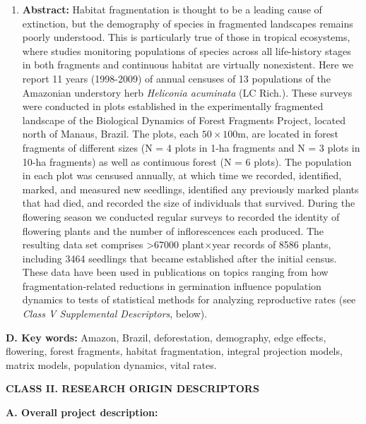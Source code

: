 \documentclass[
  12pt,
  man, donotrepeattitle,floatsintext]{apa6}
\providecommand{\tightlist}{%
  \setlength{\itemsep}{0pt}\setlength{\parskip}{0pt}}
\begin{document}
\begin{enumerate}
\def\labelenumi{\arabic{enumi}.}
\setcounter{enumi}{1}
\tightlist
\item
  \textbf{Abstract:} Habitat fragmentation is thought to be a leading cause of extinction, but the demography of species in fragmented landscapes remains poorly understood. This is particularly true of those in tropical ecosystems, where studies monitoring populations of species across all life-history stages in both fragments and continuous habitat are virtually nonexistent. Here we report 11 years (1998-2009) of annual censuses of 13 populations of the Amazonian understory herb \emph{Heliconia acuminata} (LC Rich.). These surveys were conducted in plots established in the experimentally fragmented landscape of the Biological Dynamics of Forest Fragments Project, located north of Manaus, Brazil. The plots, each \(50\times100\)m, are located in forest fragments of different sizes (N = 4 plots in 1-ha fragments and N = 3 plots in 10-ha fragments) as well as continuous forest (N = 6 plots). The population in each plot was censused annually, at which time we recorded, identified, marked, and measured new seedlings, identified any previously marked plants that had died, and recorded the size of individuals that survived. During the flowering season we conducted regular surveys to recorded the identity of flowering plants and the number of inflorescences each produced. The resulting data set comprises \textgreater67000 plant\(\times\)year records of 8586 plants, including 3464 seedlings that became established after the initial census. These data have been used in publications on topics ranging from how fragmentation-related reductions in germination influence population dynamics to tests of statistical methods for analyzing reproductive rates (see \emph{Class V Supplemental Descriptors}, below).
\end{enumerate}

\noindent
\textbf{D. Key words:} Amazon, Brazil, deforestation, demography, edge effects, flowering, forest fragments, habitat fragmentation, integral projection models, matrix models, population dynamics, vital rates.

\noindent 
\textbf{CLASS II. RESEARCH ORIGIN DESCRIPTORS}

\noindent  
\textbf{A. Overall project description:}
\end{document}
